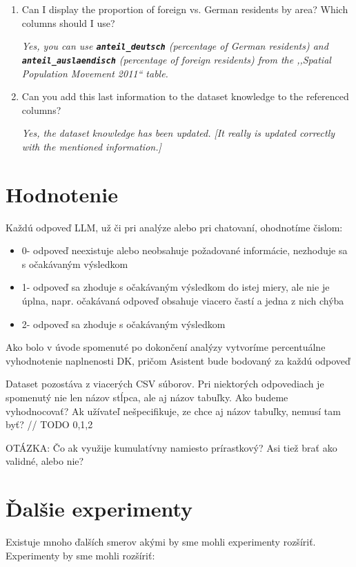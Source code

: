 \begin{enumerate}
\item Can I display the proportion of foreign vs. German residents by area? Which columns should I use?

\textit{Yes, you can use \textbf{\texttt{anteil\_deutsch}} (percentage of German residents) and \textbf{\texttt{anteil\_auslaendisch}} (percentage of foreign residents) from the ,,Spatial Population Movement 2011`` table.}

\item Can you add this last information to the dataset knowledge to the referenced columns?

\textit{Yes, the dataset knowledge has been updated. [It really is updated correctly with the mentioned information.]}
\end{enumerate}

\section{Hodnotenie}

Každú odpoveď LLM, už či pri analýze alebo pri chatovaní, ohodnotíme čislom:
\begin{itemize}
\item 0\-- odpoveď neexistuje alebo neobsahuje požadované informácie, nezhoduje sa s očakávaným výsledkom
\item 1\-- odpoveď sa zhoduje s očakávaným výsledkom do istej miery, ale nie je úplna, napr. očakávaná odpoveď obsahuje viacero častí a jedna z nich chýba
\item 2\-- odpoveď sa zhoduje s očakávaným výsledkom
\end{itemize}

Ako bolo v úvode spomenuté po dokončení analýzy vytvoríme percentuálne vyhodnotenie naplnenosti DK, pričom Asistent bude bodovaný za každú odpoveď

Dataset pozostáva z viacerých CSV súborov. Pri niektorých odpovediach je spomenutý nie len názov stĺpca, ale aj názov tabuľky. Ako budeme vyhodnocovať? Ak užívateľ nešpecifikuje, ze chce aj názov tabuľky, nemusí tam byť?
// TODO 0,1,2

OTÁZKA: Čo ak využije kumulatívny namiesto prírastkový? Asi tiež brať ako validné, alebo nie?


\section{Ďalšie experimenty}

Existuje mnoho ďalších smerov akými by sme mohli experimenty rozšíriť. Experimenty by sme mohli rozšíriť:

